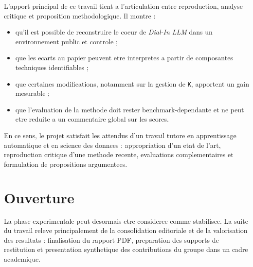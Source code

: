 L'apport principal de ce travail tient a l'articulation entre reproduction,
analyse critique et proposition methodologique. Il montre :
\begin{itemize}[leftmargin=*]
  \item qu'il est possible de reconstruire le coeur de \emph{Dial-In LLM} dans
  un environnement public et controle ;
  \item que les ecarts au papier peuvent etre interpretes a partir de
  composantes techniques identifiables ;
  \item que certaines modifications, notamment sur la gestion de \texttt{K},
  apportent un gain mesurable ;
  \item que l'evaluation de la methode doit rester benchmark-dependante et ne
  peut etre reduite a un commentaire global sur les scores.
\end{itemize}

En ce sens, le projet satisfait les attendus d'un travail tutore en
apprentissage automatique et en science des donnees : appropriation d'un etat
de l'art, reproduction critique d'une methode recente, evaluations
complementaires et formulation de propositions argumentees.

\section{Ouverture}

La phase experimentale peut desormais etre consideree comme stabilisee. La
suite du travail releve principalement de la consolidation editoriale et de la
valorisation des resultats : finalisation du rapport PDF, preparation des
supports de restitution et presentation synthetique des contributions du groupe
dans un cadre academique.
